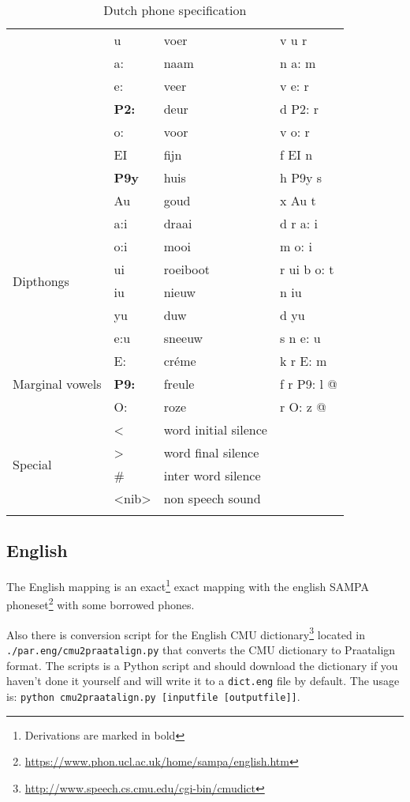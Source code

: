 {\begin{longtable}{l|l|l|l}
	& u & voer & v u r\\
	& a: & naam & n a: m\\
	& e: & veer & v e: r\\
	& \textbf{P2:} & deur & d P2: r\\
	& o: & voor & v o: r\\
	& EI & fijn & f EI n\\
	& \textbf{P9y} &huis & h P9y s\\
	& Au & goud & x Au t\\
	\hline
	\multirow{6}{*}{Dipthongs} &
	a:i & draai & d r a: i\\
	& o:i &mooi & m o: i\\
	& ui & roeiboot & r ui b o: t\\
	& iu & nieuw & n iu\\
	& yu & duw & d yu\\
	& e:u & sneeuw & s n e: u\\
	\hline
	\multirow{3}{*}{Marginal vowels} &
	E: & cr\'eme & k r E: m\\
	& \textbf{P9:} & freule & f r P9: l @\\
	& O: & roze & r O: z @\\
	\hline
	\multirow{4}{*}{Special} &
	\textless & word initial silence & \\
	& \textgreater & word final silence & \\
	& \# & inter word silence & \\
	& \textless nib\textgreater & non speech sound & \\
	\hline
	\caption{Dutch phone specification}
\end{longtable}
}

\subsection{English}
The English mapping is an exact\footnote{Derivations are marked in bold} exact
mapping with the english SAMPA phoneset\footnote{\url{
https://www.phon.ucl.ac.uk/home/sampa/english.htm}} with some borrowed phones.

Also there is conversion script for the English CMU
dictionary\footnote{\url{http://www.speech.cs.cmu.edu/cgi-bin/cmudict}} located
in \texttt{./par.eng/cmu2praatalign.py} that converts the CMU dictionary to
Praatalign format. The scripts is a Python script and should download the
dictionary if you haven't done it yourself and will write it to a
\texttt{dict.eng} file by default. The usage is: \texttt{python
cmu2praatalign.py [inputfile [outputfile]]}.

